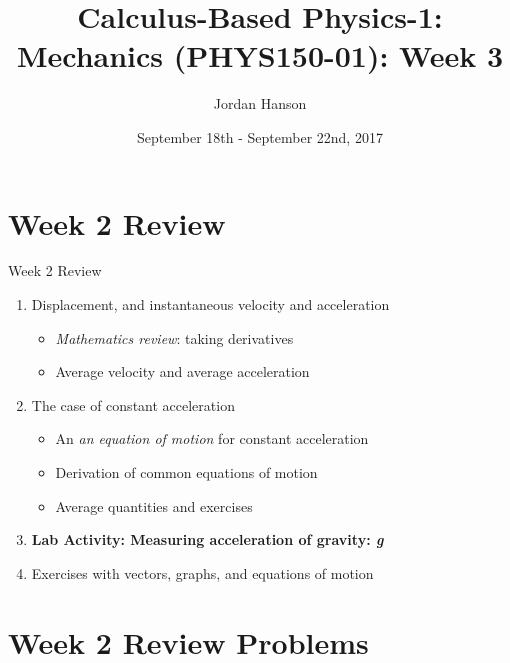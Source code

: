 \documentclass{beamer}
\title{Calculus-Based Physics-1: Mechanics (PHYS150-01): Week 3}
\date{September 18th - September 22nd, 2017}
\author{Jordan Hanson}
\institute{Whittier College Department of Physics and Astronomy}
\begin{document}
\maketitle

\section{Week 2 Review}

\begin{frame}{Week 2 Review}
\begin{enumerate}
\item Displacement, and instantaneous velocity and acceleration
\begin{itemize}
\item \textit{Mathematics review}: taking derivatives
\item Average velocity and average acceleration
\end{itemize}
\item The case of constant acceleration
\begin{itemize}
\item An \textit{an equation of motion} for constant acceleration
\item Derivation of \alert{common equations of motion}
\item Average quantities and exercises
\end{itemize}
\item \textbf{Lab Activity: Measuring acceleration of gravity: \textit{g}}
\item Exercises with vectors, graphs, and equations of motion
\end{enumerate}
\end{frame}

\section{Week 2 Review Problems}
\end{document}
